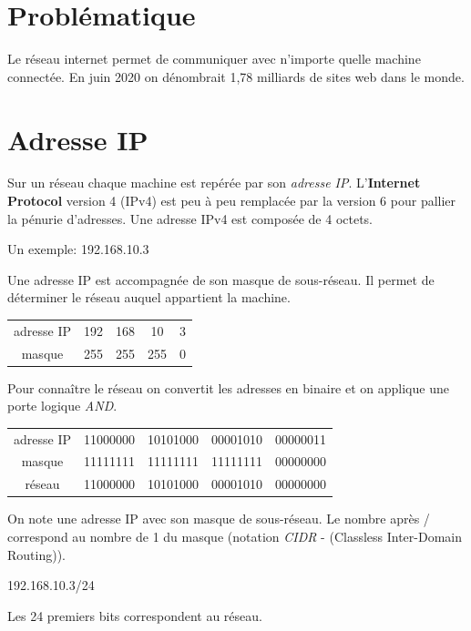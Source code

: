 \documentclass[a4paper,11pt]{article}
\begin{document}
\section{Problématique}
Le réseau internet permet de communiquer avec n'importe quelle machine connectée. En juin 2020 on dénombrait 1,78 milliards de sites web dans le monde.
\begin{center}
\end{center}
\section{Adresse IP}
Sur un réseau chaque machine est repérée par son \emph{adresse IP}. L'\textbf{Internet Protocol} version 4 (IPv4) est peu à peu remplacée par la version 6 pour pallier la pénurie d'adresses. Une adresse IPv4 est composée de 4 octets.
\begin{center}
    Un exemple: \large{192.168.10.3}
\end{center}
Une adresse IP est accompagnée de son masque de sous-réseau. Il permet de déterminer le réseau auquel appartient la machine.
\begin{center}
    \begin{tabular}{ccccc}
        adresse IP & 192 & 168 & 10  & 3 \\
        masque     & 255 & 255 & 255 & 0 \\
    \end{tabular}
\end{center}
Pour connaître le réseau on convertit les adresses en binaire et on applique une porte logique \emph{AND}.
\begin{center}
    \begin{tabular}{ccccc}
        adresse IP & 11000000 & 10101000 & 00001010 & 00000011 \\
        masque     & 11111111 & 11111111 & 11111111 & 00000000 \\
        réseau     & 11000000 & 10101000 & 00001010 & 00000000 \\
    \end{tabular}
\end{center}

\begin{aretenir}[]
    On note une adresse IP avec son masque de sous-réseau. Le nombre après / correspond au nombre de 1 du masque (notation \emph{CIDR} - (Classless Inter-Domain Routing)).
    \begin{center}
        192.168.10.3/24
    \end{center}
    Les 24 premiers bits correspondent au réseau.
\end{aretenir}
\end{document}
